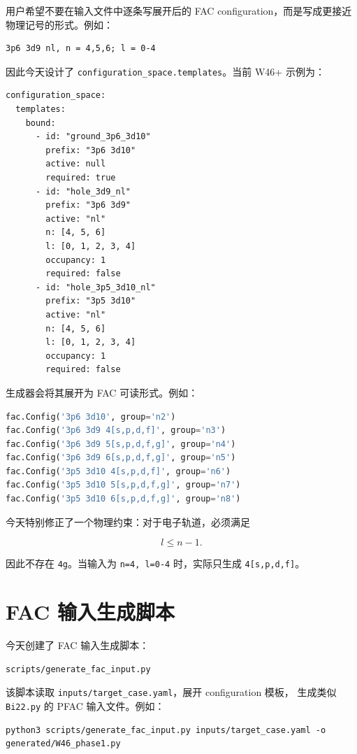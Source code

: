 \documentclass[11pt,a4paper]{article}
\begin{document}
用户希望不要在输入文件中逐条写展开后的 FAC configuration，而是写成更接近
物理记号的形式。例如：

\begin{lstlisting}
3p6 3d9 nl, n = 4,5,6; l = 0-4
\end{lstlisting}

因此今天设计了 \texttt{configuration\_space.templates}。当前 W46+ 示例为：

\begin{lstlisting}
configuration_space:
  templates:
    bound:
      - id: "ground_3p6_3d10"
        prefix: "3p6 3d10"
        active: null
        required: true
      - id: "hole_3d9_nl"
        prefix: "3p6 3d9"
        active: "nl"
        n: [4, 5, 6]
        l: [0, 1, 2, 3, 4]
        occupancy: 1
        required: false
      - id: "hole_3p5_3d10_nl"
        prefix: "3p5 3d10"
        active: "nl"
        n: [4, 5, 6]
        l: [0, 1, 2, 3, 4]
        occupancy: 1
        required: false
\end{lstlisting}

生成器会将其展开为 FAC 可读形式。例如：

\begin{lstlisting}[language=Python]
fac.Config('3p6 3d10', group='n2')
fac.Config('3p6 3d9 4[s,p,d,f]', group='n3')
fac.Config('3p6 3d9 5[s,p,d,f,g]', group='n4')
fac.Config('3p6 3d9 6[s,p,d,f,g]', group='n5')
fac.Config('3p5 3d10 4[s,p,d,f]', group='n6')
fac.Config('3p5 3d10 5[s,p,d,f,g]', group='n7')
fac.Config('3p5 3d10 6[s,p,d,f,g]', group='n8')
\end{lstlisting}

今天特别修正了一个物理约束：对于电子轨道，必须满足

\[
l \le n - 1.
\]

因此不存在 \texttt{4g}。当输入为 \texttt{n=4, l=0-4} 时，实际只生成
\texttt{4[s,p,d,f]}。

\section{FAC 输入生成脚本}

今天创建了 FAC 输入生成脚本：

\begin{lstlisting}
scripts/generate_fac_input.py
\end{lstlisting}

该脚本读取 \texttt{inputs/target\_case.yaml}，展开 configuration 模板，
生成类似 \texttt{Bi22.py} 的 PFAC 输入文件。例如：

\begin{lstlisting}
python3 scripts/generate_fac_input.py inputs/target_case.yaml -o generated/W46_phase1.py
\end{lstlisting}
\end{document}

